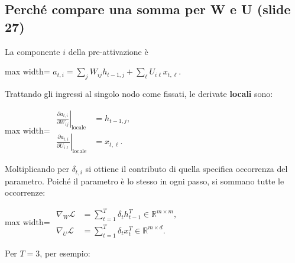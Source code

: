 \documentclass[11pt,a4paper,oneside,openany]{book}
\begin{document}
\subsection{Perché compare una somma per W e U (slide 27)}\label{f03-r465}

La componente \(i\) della pre-attivazione è

\begin{center}
\begin{adjustbox}{max width=\linewidth}
$\displaystyle a_{t,i}=\sum_jW_{ij}h_{t-1,j}+\sum_\ell U_{i\ell}x_{t,\ell}.$
\end{adjustbox}
\end{center}

Trattando gli ingressi al singolo nodo come fissati, le derivate \textbf{locali} sono:

\begin{center}
\begin{adjustbox}{max width=\linewidth}
$\displaystyle 
\begin{aligned}
\left.\frac{\partial a_{t,i}}{\partial W_{ij}}\right|_{\mathrm{locale}}
&=h_{t-1,j},\\
\left.\frac{\partial a_{t,i}}{\partial U_{i\ell}}\right|_{\mathrm{locale}}
&=x_{t,\ell}.
\end{aligned}
$
\end{adjustbox}
\end{center}

Moltiplicando per \(\delta_{t,i}\) si ottiene il contributo di quella specifica occorrenza del parametro. Poiché il parametro è lo stesso in ogni passo, si sommano tutte le occorrenze:

\begin{center}
\begin{adjustbox}{max width=\linewidth}
$\displaystyle 
\boxed{\begin{aligned}
\nabla_W\mathcal L&=\sum_{t=1}^{T}\delta_t h_{t-1}^T\in\mathbb R^{m\times m},\\
\nabla_U\mathcal L&=\sum_{t=1}^{T}\delta_t x_t^T\in\mathbb R^{m\times d}.
\end{aligned}}
$
\end{adjustbox}
\end{center}

Per \(T=3\), per esempio:
\end{document}
